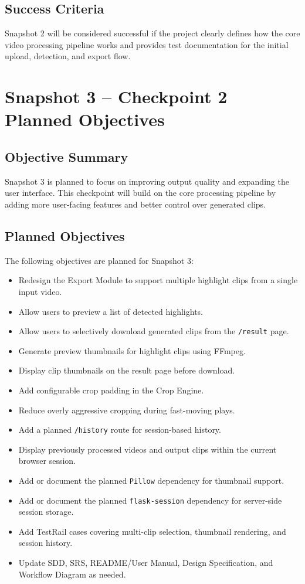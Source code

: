 \documentclass[12pt]{article}
\begin{document}
\subsection{Success Criteria}
Snapshot 2 will be considered successful if the project clearly defines how the core video processing pipeline works and provides test documentation for the initial upload, detection, and export flow.

\newpage

\section{Snapshot 3 -- Checkpoint 2 Planned Objectives}

\subsection{Objective Summary}
Snapshot 3 is planned to focus on improving output quality and expanding the user interface. This checkpoint will build on the core processing pipeline by adding more user-facing features and better control over generated clips.

\subsection{Planned Objectives}
The following objectives are planned for Snapshot 3:

\begin{itemize}[noitemsep]
    \item Redesign the Export Module to support multiple highlight clips from a single input video.
    \item Allow users to preview a list of detected highlights.
    \item Allow users to selectively download generated clips from the \texttt{/result} page.
    \item Generate preview thumbnails for highlight clips using FFmpeg.
    \item Display clip thumbnails on the result page before download.
    \item Add configurable crop padding in the Crop Engine.
    \item Reduce overly aggressive cropping during fast-moving plays.
    \item Add a planned \texttt{/history} route for session-based history.
    \item Display previously processed videos and output clips within the current browser session.
    \item Add or document the planned \texttt{Pillow} dependency for thumbnail support.
    \item Add or document the planned \texttt{flask-session} dependency for server-side session storage.
    \item Add TestRail cases covering multi-clip selection, thumbnail rendering, and session history.
    \item Update SDD, SRS, README/User Manual, Design Specification, and Workflow Diagram as needed.
\end{itemize}
\end{document}
